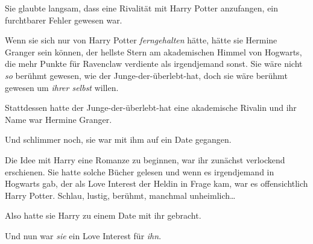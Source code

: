 Sie glaubte langsam, dass eine Rivalität mit Harry Potter anzufangen, ein furchtbarer Fehler gewesen war.

Wenn sie sich nur von Harry Potter \emph{ferngehalten} hätte, hätte sie Hermine Granger sein können, der hellste Stern am akademischen Himmel von Hogwarts, die mehr Punkte für Ravenclaw verdiente als irgendjemand sonst. Sie wäre nicht \emph{so} berühmt gewesen, wie der Junge-der-überlebt-hat, doch sie wäre berühmt gewesen um \emph{ihrer selbst} willen.

Stattdessen hatte der Junge-der-überlebt-hat eine akademische Rivalin und ihr Name war Hermine Granger.

Und schlimmer noch, sie war mit ihm auf ein Date gegangen.

Die Idee mit Harry eine Romanze zu beginnen, war ihr zunächst verlockend erschienen. Sie hatte solche Bücher gelesen und wenn es irgendjemand in Hogwarts gab, der als Love Interest der Heldin in Frage kam, war es offensichtlich Harry Potter. Schlau, lustig, berühmt, manchmal unheimlich…

Also hatte sie Harry zu einem Date mit ihr gebracht.

Und nun war \emph{sie} ein Love Interest für \emph{ihn}.

